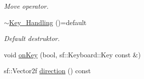 \begin{DoxyCompactItemize}
\begin{DoxyCompactList}\small\item\em Move operator. \end{DoxyCompactList}\item 
\hyperlink{classKey__Handling_abaeb9c9b746106e475c8d91743271cab}{$\sim$\+Key\+\_\+\+Handling} ()=default
\begin{DoxyCompactList}\small\item\em Default destruktor. \end{DoxyCompactList}\item 
void \hyperlink{classKey__Handling_a44d85d656914e718a9b155c41d687771}{on\+Key} (bool, sf\+::\+Keyboard\+::\+Key const \&)
\item 
sf\+::\+Vector2f \hyperlink{classKey__Handling_adaea1f1ba27262539509061cbc818361}{direction} () const 
\end{DoxyCompactItemize}
